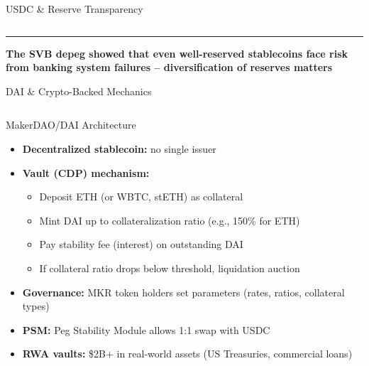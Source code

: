 \documentclass[8pt,aspectratio=169]{beamer}
\newcommand{\bottomnote}[1]{\vfill\vspace{-2mm}\textcolor{mllavender2}{\rule{\textwidth}{0.4pt}}\vspace{1mm}\footnotesize\textbf{#1}}
\begin{document}
\begin{frame}{USDC \& Reserve Transparency}
\begin{columns}[T]
\end{columns}
\bottomnote{The SVB depeg showed that even well-reserved stablecoins face risk from banking system failures -- diversification of reserves matters}
\end{frame}

\begin{frame}{DAI \& Crypto-Backed Mechanics}
\begin{columns}[T]
\begin{block}{MakerDAO/DAI Architecture}
\footnotesize
\begin{itemize}
  \item \textbf{Decentralized stablecoin:} no single issuer
  \item \textbf{Vault (CDP) mechanism:}
    \begin{itemize}\scriptsize
      \item Deposit ETH (or WBTC, stETH) as collateral
      \item Mint DAI up to collateralization ratio (e.g., 150\% for ETH)
      \item Pay stability fee (interest) on outstanding DAI
      \item If collateral ratio drops below threshold, liquidation auction
    \end{itemize}
  \item \textbf{Governance:} MKR token holders set parameters (rates, ratios, collateral types)
  \item \textbf{PSM:} Peg Stability Module allows 1:1 swap with USDC
  \item \textbf{RWA vaults:} \$2B+ in real-world assets (US Treasuries, commercial loans)
\end{itemize}
\end{block}


\end{columns}
\end{frame}
\end{document}
